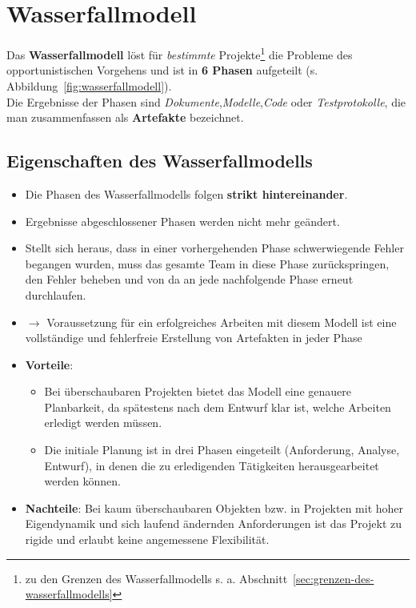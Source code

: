 \section{Wasserfallmodell}

Das \textbf{Wasserfallmodell} löst für \textit{bestimmte} Projekte\footnote{
zu den Grenzen des Wasserfallmodells s. a. Abschnitt~\ref{sec:grenzen-des-wasserfallmodells}
} die Probleme des opportunistischen Vorgehens und ist in \textbf{6 Phasen} aufgeteilt (s. Abbildung~\ref{fig:wasserfallmodell}).\\
Die Ergebnisse der Phasen sind \textit{Dokumente},\textit{Modelle},\textit{Code} oder \textit{Testprotokolle}, die man zusammenfassen als \textbf{Artefakte} bezeichnet.\\

\subsection*{Eigenschaften des Wasserfallmodells}
\begin{itemize}
    \item Die Phasen des Wasserfallmodells folgen \textbf{strikt hintereinander}.
    \item Ergebnisse abgeschlossener Phasen werden nicht mehr geändert.
    \item Stellt sich heraus, dass in einer vorhergehenden Phase schwerwiegende Fehler begangen wurden, muss das gesamte Team in diese Phase zurückspringen, den Fehler beheben und von da an jede nachfolgende Phase erneut durchlaufen.
    \item[] $\rightarrow$ Voraussetzung für ein erfolgreiches Arbeiten mit diesem Modell ist eine vollständige und fehlerfreie Erstellung von Artefakten in jeder Phase
    \item \textbf{Vorteile}:
        \begin{itemize}
            \item Bei überschaubaren Projekten bietet das Modell eine genauere Planbarkeit, da spätestens nach dem Entwurf klar ist, welche Arbeiten erledigt werden müssen.
            \item Die initiale Planung ist in drei Phasen eingeteilt (Anforderung, Analyse, Entwurf), in denen die zu erledigenden Tätigkeiten herausgearbeitet werden können.
        \end{itemize}
    \item \textbf{Nachteile}: Bei kaum überschaubaren Objekten bzw. in Projekten mit hoher Eigendynamik und sich laufend ändernden Anforderungen ist das Projekt zu rigide und erlaubt keine angemessene Flexibilität.
\end{itemize}



